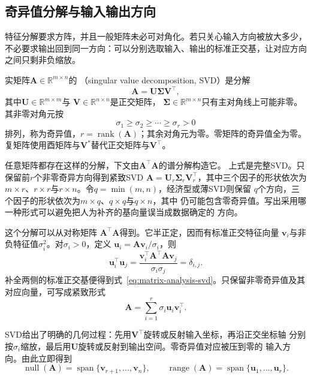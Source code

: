 \subsection{奇异值分解与输入输出方向}

特征分解要求方阵，并且一般矩阵未必可对角化。若只关心输入方向被放大多少，不必要求输出回到同一方向：可以分别选取输入、输出的标准正交基，让对应方向之间只剩非负缩放。

\begin{definition}[奇异值分解]
\label{def:matrix-analysis-svd}
实矩阵$\bm{A}\in\mathbb{R}^{m\times n}$的
（singular value decomposition, SVD）是分解
\begin{equation}
  \bm{A}=\bm{U}\bm{\Sigma}\bm{V}^{\top},
  \label{eq:matrix-analysis-svd}
\end{equation}
其中$\bm{U}\in\mathbb{R}^{m\times m}$与
$\bm{V}\in\mathbb{R}^{n\times n}$是正交矩阵，
$\bm{\Sigma}\in\mathbb{R}^{m\times n}$只有主对角线上可能非零。其非零对角元按
\[
  \sigma_1\geq\sigma_2\geq\cdots\geq\sigma_r>0
\]
排列，称为奇异值，$r=\operatorname{rank}(\bm{A})$；其余对角元为零。零矩阵的奇异值全为零。复矩阵使用酉矩阵与$\bm V^*$替代正交矩阵与$\bm V^{\top}$。
\end{definition}

任意矩阵都存在这样的分解，下文由$\bm A^{\top}\bm A$的谱分解构造它。
上式是完整SVD。只保留前$r$个非零奇异方向得到紧致SVD
$\bm{A}=\bm{U}_r\bm{\Sigma}_r\bm{V}_r^{\top}$，其中三个因子的形状依次为
$m\times r$、$r\times r$与$r\times n$。令$q=\min(m,n)$，经济型或薄SVD则保留
$q$个方向，三个因子的形状依次为$m\times q$、$q\times q$与$q\times n$，其中
仍可能包含零奇异值。写出采用哪一种形式可以避免把人为补齐的基向量误当成数据确定的
方向。

这个分解可以从对称矩阵
$\bm{A}^{\top}\bm{A}$得到。它半正定，因而有标准正交特征向量
$\bm{v}_i$与非负特征值$\sigma_i^2$。对$\sigma_i>0$，定义
$\bm{u}_i=\bm{A}\bm{v}_i/\sigma_i$，则
\[
  \bm{u}_i^{\top}\bm{u}_j=
  \frac{\bm{v}_i^{\top}\bm{A}^{\top}\bm{A}\bm{v}_j}
       {\sigma_i\sigma_j}=\delta_{i,j}.
\]
补全两侧的标准正交基便得到式~\eqref{eq:matrix-analysis-svd}。只保留非零奇异值及其
对应向量，可写成紧致形式
\begin{equation}
  \bm{A}=\sum_{i=1}^{r}\sigma_i\bm{u}_i\bm{v}_i^{\top}.
  \label{eq:matrix-analysis-svd-rank-one-sum}
\end{equation}

SVD给出了明确的几何过程：先用$\bm{V}^{\top}$旋转或反射输入坐标，再沿正交坐标轴
分别按$\sigma_i$缩放，最后用$\bm{U}$旋转或反射到输出空间。零奇异值对应被压到零的
输入方向。由此立即得到
\[
  \operatorname{null}(\bm{A})=
  \operatorname{span}\{\bm{v}_{r+1},\ldots,\bm{v}_n\},
  \qquad
  \operatorname{range}(\bm{A})=
  \operatorname{span}\{\bm{u}_1,\ldots,\bm{u}_r\}.
\]

